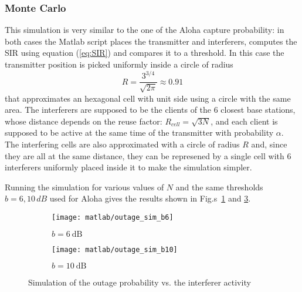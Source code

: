 \documentclass[a4paper,oneside]{article}
\begin{document}
\subsubsection*{Monte Carlo}
This simulation is very similar to the one of the Aloha capture
probability: in both cases the Matlab script places the transmitter
and interferers, computes the SIR using equation (\ref{eq:SIR}) and compares it to
a threshold.
%
In this case the transmitter position is picked uniformly inside a
circle of radius
\begin{equation}
  R=\frac{3^{3/4}}{\sqrt{2\pi}} \approx 0.91
\end{equation}
that approximates an hexagonal cell with unit side using a circle with
the same area.
%
The interferers are supposed to be the clients of the 6 closest base
stations, whose distance depends on the reuse factor: $R_{cell} =
\sqrt{3N}$, and each client is supposed to be active at the same time
of the transmitter with probability $\alpha$.
%
The interfering cells are also approximated with a circle of radius
$R$ and, since they are all at the same distance, they can be
represened by a single cell with 6 interferers uniformly placed inside
it to make the simulation simpler.

Running the simulation for various values of $N$ and the same
thresholds $b= 6, 10 \, \si{dB}$ used for Aloha gives the results
shown in Fig.s~\ref{plot:outage_sim_b6} and \ref{plot:outage_sim_b10}.
\begin{figure}[htbp]
  \centering
  \begin{subfigure}{0.5\textwidth}
    \centering
    \texttt{[image: matlab/outage\_sim\_b6]}
    \caption{$ b = \SI{6}{\dB}$}
    \label{plot:outage_sim_b6}
  \end{subfigure}%
  \begin{subfigure}{0.5\textwidth}
    \centering
    \texttt{[image: matlab/outage\_sim\_b10]}
    \caption{$ b = \SI{10}{\dB}$}
    \label{plot:outage_sim_b10}
  \end{subfigure}
  \caption{Simulation of the outage probability vs. the interferer
    activity}
\end{figure}
\end{document}
